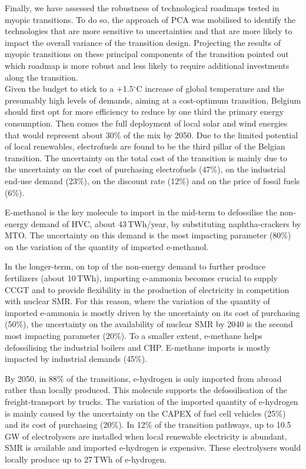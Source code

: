 Finally, we have assessed the robustness of technological roadmaps tested in myopic transitions. To do so, the approach of \acrfull{PCA} was mobilised to identify the technologies that are more sensitive to uncertainties and that are more likely to impact the overall variance of the transition design. Projecting the results of myopic transitions on these principal components of the transition pointed out which roadmap is more robust and less likely to require additional investments along the transition.\\

Given the  budget to stick to a +1.5$^{\circ}$C increase of global temperature and the presumably high levels of demands,  aiming at a cost-optimum transition, Belgium should first opt for more efficiency to reduce by one third the primary energy consumption. Then comes the full deployment of local solar and wind energies that would represent about 30\% of the mix by 2050. Due to the limited potential of local renewables, electrofuels are found to be the third pillar of the Belgian transition. The uncertainty on the total cost of the transition is mainly due to the uncertainty on the cost of purchasing electrofuels (47\%), on the industrial end-use demand (23\%), on the discount rate (12\%) and on the price of fossil fuels (6\%).

E-methanol is the key molecule to import in the mid-term to defossilise the non-energy demand of \acrfull{HVC}, about 43\,TWh/year, by substituting naphtha-crackers by \acrfull{MTO}. The uncertainty on this demand is the most impacting parameter (80\%) on the variation of the quantity of imported e-methanol. 

In the longer-term, on top of the non-energy demand to further produce fertilizers (about 10\,TWh), importing e-ammonia becomes crucial to supply \acrfull{CCGT} and to provide flexibility in the production of electricity in competition with nuclear \acrfull{SMR}. For this reason, where the variation of the quantity of imported e-ammonia is mostly driven by the uncertainty on its cost of purchasing (50\%), the uncertainty on the availability of nuclear \gls{SMR} by 2040 is the second most impacting parameter (20\%). To a smaller extent, e-methane helps defossilising the industrial boilers and \acrfull{CHP}. E-methane imports is mostly impacted by industrial demands (45\%). 

By 2050, in 88\% of the transitions, e-hydrogen is only imported from abroad rather than locally produced. This molecule supports the defossilisation of the freight-transport by trucks. The variation of the imported quantity of e-hydrogen is mainly caused by the uncertainty on the CAPEX of fuel cell vehicles (25\%) and its cost of purchasing (20\%). In 12\% of the transition pathways, up to 10.5\,GW of electrolysers are installed when local renewable electricity is abundant, \gls{SMR} is available and imported e-hydrogen is expensive. These electrolysers would locally produce up to 27\,TWh of e-hydrogen. 

